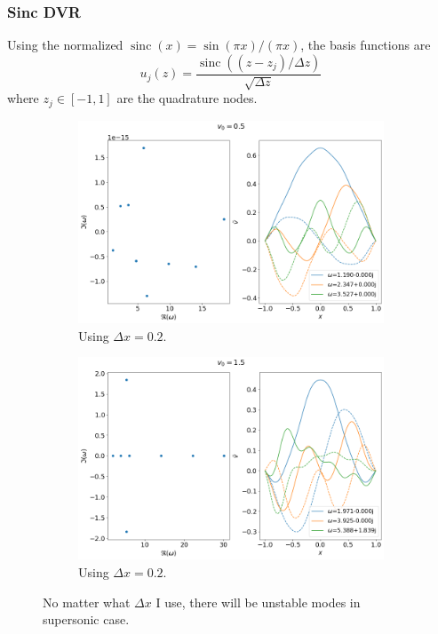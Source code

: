 \documentclass{article}
\DeclareMathOperator{\sinc}{sinc}
\begin{document}
\subsubsection{Sinc DVR}
Using the normalized $\sinc(x)=\sin(\pi x)/(\pi x)$, the basis functions are 
$$u_j(z) = \frac{\sinc((z-z_j)/\Delta z)}{\sqrt{\Delta z}}$$
where $z_j\in[-1,1]$ are the quadrature nodes.
\begin{figure}[H]
    \centering
    \begin{subfigure}[b]{0.45\linewidth}
        \includegraphics[width=\linewidth]{img/results-sinc-dvr-dx=0.2,v0=0.5.png}
        \caption{Using $\Delta x=0.2$.}
    \end{subfigure}%
    \begin{subfigure}[b]{0.45\linewidth}
        \includegraphics[width=\linewidth]{img/results-sinc-dvr-dx=0.2,v0=1.5.png}
        \caption{Using $\Delta x=0.2$.}
    \end{subfigure}
    \caption{No matter what $\Delta x$ I use, there will be unstable modes in supersonic case.}
    \label{fig:results-sinc-dvr}
\end{figure}
\end{document}
